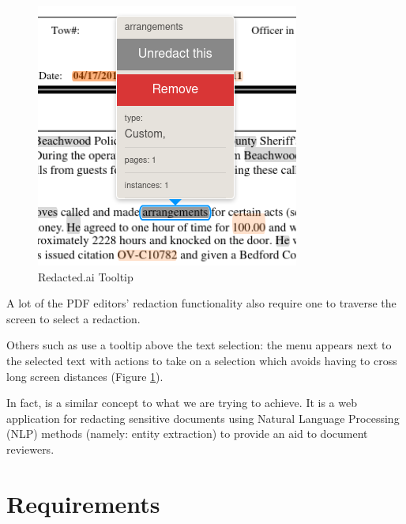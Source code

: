 \documentclass{l4proj}
\begin{document}
\begin{figure}
    \includegraphics[width=\linewidth]{images/related_products/redactedai_tooltip.png}
    \caption{Redacted.ai Tooltip}
    \label{fig:redactedai-tooltip}
\end{figure}

A lot of the PDF editors' redaction functionality also require one to traverse the screen to select a redaction.

Others such as \textcite{RedactedAIRemovea} use a tooltip above the text selection: the menu appears next to the selected text with actions to take on a selection which avoids having to cross long screen distances (Figure \ref{fig:redactedai-tooltip}).

In fact, \textcite{RedactedAIRemovea} is a similar concept to what we are trying to achieve. It is a web application for redacting sensitive documents using Natural Language Processing (NLP) methods (namely: entity extraction) to provide an aid to document reviewers.




\chapter{Requirements}
\end{document}
